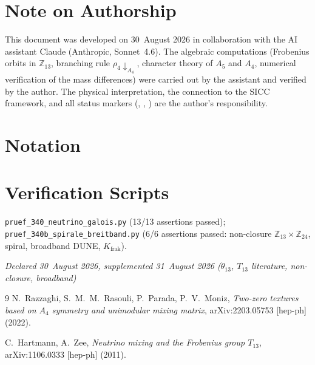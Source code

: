 \section{Note on Authorship}

This document was developed on 30~August 2026 in collaboration with the
AI assistant Claude (Anthropic, Sonnet~4.6). The algebraic computations
(Frobenius orbits in $\mathbb{Z}_{13}$, branching rule
$\rho_4\!\downarrow_{A_4}$, character theory of $A_5$ and $A_4$,
numerical verification of the mass differences) were carried out by the
assistant and verified by the author. The physical interpretation,
the connection to the SICC framework, and all status markers
(\BM, \KM, \SM) are the author's responsibility.

\section{Notation}



\section{Verification Scripts}

\texttt{pruef\_340\_neutrino\_galois.py} (13/13 assertions passed);\\
\texttt{pruef\_340b\_spirale\_breitband.py} (6/6 assertions passed:
non-closure $\mathbb{Z}_{13}\times\mathbb{Z}_{24}$, spiral,
broadband DUNE, $K_\text{frak}$).

\emph{Declared 30~August 2026, supplemented 31~August 2026 ($\theta_{13}$, $T_{13}$ literature, non-closure, broadband)}

\begin{thebibliography}{9}
N.~Razzaghi, S.~M.~M.~Rasouli, P.~Parada, P.~V.~Moniz,
\emph{Two-zero textures based on $A_4$ symmetry and unimodular mixing matrix},
arXiv:2203.05753 [hep-ph] (2022).

C.~Hartmann, A.~Zee,
\emph{Neutrino mixing and the Frobenius group $T_{13}$},
arXiv:1106.0333 [hep-ph] (2011).
\end{thebibliography}

